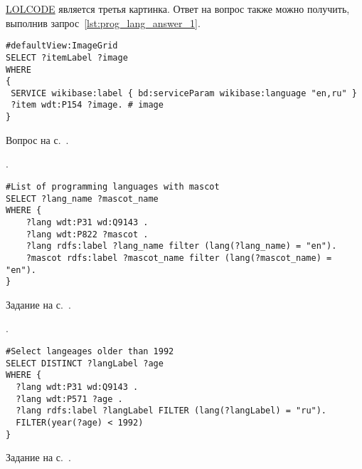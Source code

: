 \begin{task}
\label{answer:prog_lang_2}
    \href{https://ru.wikipedia.org/wiki/LOLCODE}{LOLCODE} является третья картинка. 
    Ответ на вопрос также можно получить, выполнив запрос~\ref{lst:prog_lang_answer_1}. 
	\begin{lstlisting}[language=SPARQL, caption={{\href{https://w.wiki/v4U}{Логотипы языков программирования}}\protect\footnotemark}, label=lst:prog_lang_answer_1]
#defaultView:ImageGrid
SELECT ?itemLabel ?image
WHERE
{
 SERVICE wikibase:label { bd:serviceParam wikibase:language "en,ru" }
 ?item wdt:P154 ?image. # image
}
\end{lstlisting}

\small{Вопрос на с.~\pageref{question:prog_lang_2}.}
\end{task}



\begin{task}
    \label{answer:prog_langs_4}
    . 
	\begin{lstlisting}[language=SPARQL, caption={{\href{https://w.wiki/v4e}{<<Персонажи-талисманы>> языков программирования}}\protect\footnotemark}, label=lst:prog_lang_answer_4]
#List of programming languages with mascot
SELECT ?lang_name ?mascot_name
WHERE {
    ?lang wdt:P31 wd:Q9143 .
    ?lang wdt:P822 ?mascot .
    ?lang rdfs:label ?lang_name filter (lang(?lang_name) = "en").
    ?mascot rdfs:label ?mascot_name filter (lang(?mascot_name) = "en").
}
	\end{lstlisting}
    
    \small{Задание на с.~\pageref{prog_lang_test}.}
\end{task}




\newpage
\begin{task}
    \label{answer:prog_langs_5}
    . 
	\begin{lstlisting}[language=SPARQL, caption={{\href{https://w.wiki/v4f}{Языки программирования, старше 1992 года}}\protect\footnotemark}, label=lst:prog_lang_answer_5]
#Select langeages older than 1992
SELECT DISTINCT ?langLabel ?age
WHERE {
  ?lang wdt:P31 wd:Q9143 .
  ?lang wdt:P571 ?age .
  ?lang rdfs:label ?langLabel FILTER (lang(?langLabel) = "ru").
  FILTER(year(?age) < 1992)
}
\end{lstlisting}
    
\small{Задание на с.~\pageref{prog_lang_test}.}
\end{task}

